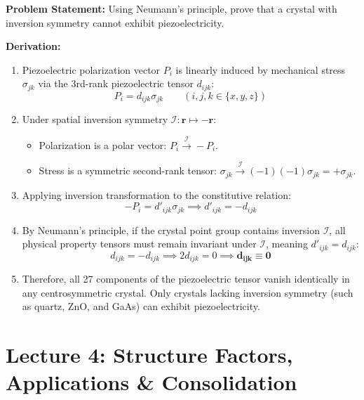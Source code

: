 \documentclass[11pt,a4paper]{article}
\begin{document}
\begin{solbox}
\textbf{Problem Statement:} Using Neumann's principle, prove that a crystal with inversion symmetry cannot exhibit piezoelectricity.

\textbf{Derivation:}
\begin{enumerate}
    \item Piezoelectric polarization vector $P_i$ is linearly induced by mechanical stress $\sigma_{jk}$ via the 3rd-rank piezoelectric tensor $d_{ijk}$:
    \begin{equation}
    P_i = d_{ijk} \sigma_{jk} \qquad (i, j, k \in \{x, y, z\})
    \end{equation}
    \item Under spatial inversion symmetry $\mathcal{I}: \mathbf{r} \mapsto -\mathbf{r}$:
    \begin{itemize}
        \item Polarization is a polar vector: $P_i \xrightarrow{\mathcal{I}} -P_i$.
        \item Stress is a symmetric second-rank tensor: $\sigma_{jk} \xrightarrow{\mathcal{I}} (-1)(-1)\sigma_{jk} = +\sigma_{jk}$.
    \end{itemize}
    \item Applying inversion transformation to the constitutive relation:
    \begin{equation}
    -P_i = d'_{ijk} \sigma_{jk} \implies d'_{ijk} = -d_{ijk}
    \end{equation}
    \item By Neumann's principle, if the crystal point group contains inversion $\mathcal{I}$, all physical property tensors must remain invariant under $\mathcal{I}$, meaning $d'_{ijk} = d_{ijk}$:
    \begin{equation}
    d_{ijk} = -d_{ijk} \implies 2d_{ijk} = 0 \implies \mathbf{d_{ijk} \equiv 0}
    \end{equation}
    \item Therefore, all 27 components of the piezoelectric tensor vanish identically in any centrosymmetric crystal. Only crystals lacking inversion symmetry (such as quartz, ZnO, and GaAs) can exhibit piezoelectricity.
\end{enumerate}
\end{solbox}

\newpage

\section{Lecture 4: Structure Factors, Applications \& Consolidation}
\end{document}
